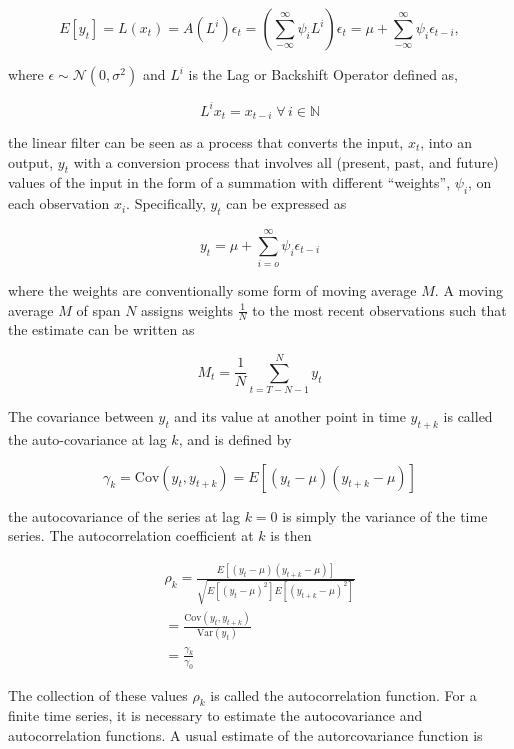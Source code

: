 \documentclass[
  11pt,
]{article}
\begin{document}
\[
E[y_{t}] = L(x_{t}) = A(L^{i})\epsilon_{t} = \left(\sum\limits_{-\infty}^{\infty} \psi_{i}L^{i}\right)\epsilon_{t} = \mu + \sum\limits_{-\infty}^{\infty}\psi_{i}\epsilon_{t-i},
\]

where \(\epsilon \sim \mathcal{N}(0, \sigma^{2})\) and \(L^{i}\) is the
Lag or Backshift Operator defined as,

\[
L^{i}x_{t} = x_{t-i} \; \forall \, i \in \mathbb{N}
\]

the linear filter can be seen as a process that converts the input,
\(x_{t}\), into an output, \(y_{t}\) with a conversion process that
involves all (present, past, and future) values of the input in the form
of a summation with different ``weights'', \(\psi_{i}\), on each
observation \(x_{i}\). Specifically, \(y_{t}\) can be expressed as

\[
y_{t} = \mu + \sum\limits_{i= o}^{\infty}\psi_{i}\epsilon_{t-i}
\]

where the weights are conventionally some form of moving average \(M\).
A moving average \(M\) of span \(N\) assigns weights \(\frac{1}{N}\) to
the most recent observations such that the estimate can be written as

\[
M_{t} = \frac{1}{N} \sum\limits_{t = T - N - 1}^{N} y_{t}
\]

The covariance between \(y_{t}\) and its value at another point in time
\(y_{t + k}\) is called the auto-covariance at lag \(k\), and is defined
by

\[
\gamma_{k} = \mathrm{Cov}(y_{t}, y_{t+k}) = E\left[(y_{t} - \mu)(y_{t+k} - \mu)\right]
\]

the autocovariance of the series at lag \(k = 0\) is simply the variance
of the time series. The autocorrelation coefficient at \(k\) is then

\begin{gather*}
\rho_{k} = \frac{E[(y_{t} - \mu)(y_{t+k} -\mu)]}{\sqrt{E[(y_{t} - \mu)^{2}]E[(y_{t+k} - \mu)^{2}]}} \\[8pt]
= \frac{\mathrm{Cov}(y_{t}, y_{t+k})}{\mathrm{Var}(y_{t})}\\[8pt]
= \frac{\gamma_{k}}{\gamma_{0}}
\end{gather*}

The collection of these values \(\rho_{k}\) is called the
autocorrelation function. For a finite time series, it is necessary to
estimate the autocovariance and autocorrelation functions. A usual
estimate of the autorcovariance function is
\end{document}
